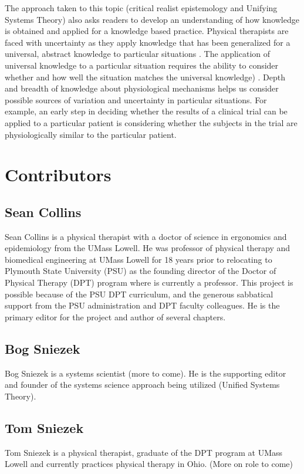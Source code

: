  The approach taken to this topic (critical realist epistemology and Unifying Systems Theory) also asks readers to develop an understanding of how knowledge is obtained and applied for a knowledge based practice. Physical therapists are faced with uncertainty as they apply knowledge that has been generalized for a universal, abstract knowledge to particular situations \cite{collins_complex_2005}. The application of universal knowledge to a particular situation requires the ability to consider whether and how well the situation matches the universal knowledge) \cite{collins_synthesis_2018, collins_particulars_2018}. Depth and breadth of knowledge about physiological mechanisms helps us consider possible sources of variation and uncertainty in particular situations. For example, an early step in deciding whether the results of a clinical trial can be applied to a particular patient is considering whether the subjects in the trial are physiologically similar to the particular patient.

 \section*{Contributors}

 \subsection*{Sean Collins}
Sean Collins is a physical therapist with a doctor of science in ergonomics and epidemiology from the UMass Lowell. He was professor of physical therapy and biomedical engineering at UMass Lowell for 18 years prior to relocating to Plymouth State University (PSU) as the founding director of the Doctor of Physical Therapy (DPT) program where is currently a professor. This project is possible because of the PSU DPT curriculum, and the generous sabbatical support from the PSU administration and DPT faculty colleagues. He is the primary editor for the project and author of several chapters.

\subsection*{Bog Sniezek}
Bog Sniezek is a systems scientist (more to come). He is the supporting editor and founder of the systems science approach being utilized (Unified Systems Theory).

\subsection*{Tom Sniezek}
Tom Sniezek is a physical therapist, graduate of the DPT program at UMass Lowell and currently practices physical therapy in Ohio. (More on role to come)

